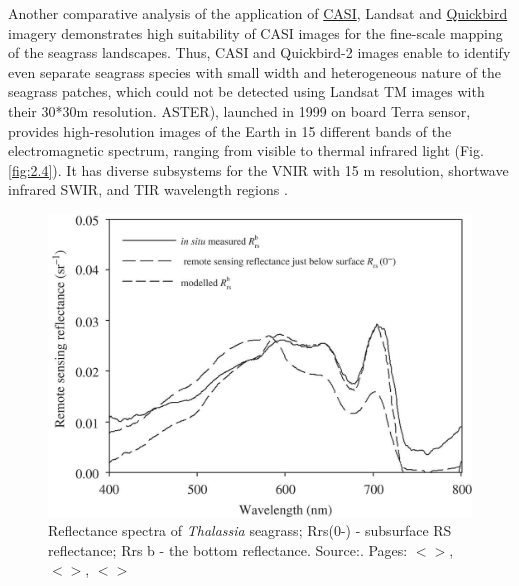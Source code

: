 \documentclass[11pt]{article}
\begin{document}
Another comparative analysis of the application of \href{http://www.itres.com/products/imagers/casi550}{CASI}, Landsat and \href{http://www.digitalglobe.com/index.php/85/QuickBird}{Quickbird} imagery \cite{Phinn08}\label{Phinn08}
 demonstrates high suitability of \ac{CASI} images for the fine-scale mapping of the seagrass
landscapes. Thus, \ac{CASI} and Quickbird-2 images enable to identify even separate seagrass species
with small width and heterogeneous nature of the seagrass patches, which could not be detected using
Landsat TM images with their 30*30m resolution.
\ac{ASTER}), launched in
1999 on board Terra sensor, provides high-resolution images of the Earth in 15 different bands of the
electromagnetic spectrum, ranging from visible to thermal infrared light  (Fig.\ref{fig:2.4}). It has diverse
subsystems for the \ac{VNIR} with 15 m resolution, shortwave infrared \ac{SWIR}, and
\ac{TIR} wavelength regions \cite{Kalinowski04}\label{Kalinowski04}. 

\begin{figure}
	\centering
	\includegraphics[scale=0.15]{Fig-15.jpg}
	\caption{Reflectance spectra of \textit{Thalassia} seagrass; Rrs(0-) - subsurface RS reflectance; Rrs b - the bottom
		reflectance. Source:\cite{Yang10}\label{Yang10}. Pages: $<$\pageref{page-21}$>$, $<$\pageref{page-22}$>$, $<$\pageref{page-54}$>$}
	\label{fig:2.6}
\end{figure}
\end{document}
